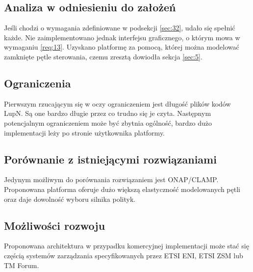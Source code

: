 \subsection{Analiza w odniesieniu do założeń} 

Jeśli chodzi o wymagania zdefiniowane w podsekcji \ref{sec:32}, udało się spełnić każde. Nie zaimplementowano jednak interfejsu graficznego, o którym mowa w wymaganiu \ref{req:13}. Uzyskano platformę za pomocą, której można modelować zamknięte pętle sterowania, czemu zresztą dowiodła sekcja \ref{sec:5}. 

\subsection{Ograniczenia}

Pierwszym rzucającym się w oczy ograniczeniem jest długość plików kodów LupN. Są one bardzo długie przez co trudno się je czyta. Następnym potencjalnym ograniczeniem może być zbytnia ogólność, bardzo dużo implementacji leży po stronie użytkownika platformy.

\subsection{Porównanie z istniejącymi rozwiązaniami}

Jedynym możliwym do porównania rozwiązaniem jest ONAP/CLAMP. Proponowana platforma oferuje dużo większą elastyczność modelowanych pętli oraz daje dowolność wyboru silnika polityk.

\subsection{Możliwości rozwoju}

Proponowana architektura w przypadku komercyjnej implementacji może stać się częścią systemów zarządzania specyfikowanych przez ETSI ENI, ETSI ZSM lub TM Forum. 

